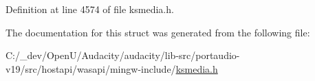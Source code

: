 Definition at line 4574 of file ksmedia.\+h.



The documentation for this struct was generated from the following file\+:\begin{DoxyCompactItemize}
\item 
C\+:/\+\_\+dev/\+Open\+U/\+Audacity/audacity/lib-\/src/portaudio-\/v19/src/hostapi/wasapi/mingw-\/include/\hyperlink{ksmedia_8h}{ksmedia.\+h}\end{DoxyCompactItemize}

